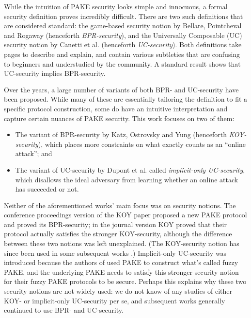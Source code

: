\documentclass{article}
\begin{document}
While the intuition of PAKE security looks simple and innocuous, a formal security definition proves incredibly difficult. There are two such definitions that are considered standard: the game-based security notion by Bellare, Pointcheval and Rogaway \cite{EC:BelPoiRog00} (henceforth \emph{BPR-security}), and the Universally Composable (UC) security notion by Canetti et al. \cite{EC:CHKLM05} (henceforth \emph{UC-security}). Both definitions take pages to describe and explain, and contain various subtleties that are confusing to beginners and understudied by the community. A standard result \cite[Appendix~A]{EC:CHKLM05} shows that UC-security implies BPR-security.

Over the years, a large number of variants of both BPR- and UC-security have been proposed. While many of these are essentially tailoring the definition to fit a specific protocol construction, some do have an intuitive interpretation and capture certain nuances of PAKE security. This work focuses on two of them:
\begin{itemize}
  \item The variant of BPR-security by Katz, Ostrovsky and Yung \cite{JACM:KatOstYun09} (henceforth \emph{KOY-security}), which places more constraints on what exactly counts as an ``online attack''; and
  \item The variant of UC-security by Dupont et al. \cite{EC:DHPRY18} called \emph{implicit-only UC-security}, which disallows the ideal adversary from learning whether an online attack has succeeded or not.
\end{itemize}
Neither of the aforementioned works' main focus was on security notions. The conference proceedings version of the KOY paper \cite{EC:KatOstYun01} proposed a new PAKE protocol and proved its BPR-security; in the journal version \cite{JACM:KatOstYun09} KOY proved that their protocol actually satisfies the stronger KOY-security, although the difference between these two notions was left unexplained. (The KOY-security notion has since been used in some subsequent works \cite{TCC:KatVai11}.) Implicit-only UC-security was introduced because the authors of \cite{EC:DHPRY18} used PAKE to construct what's called fuzzy PAKE, and the underlying PAKE needs to satisfy this stronger security notion for their fuzzy PAKE protocols to be secure. Perhaps this explains why these two security notions are not widely used: we do not know of any studies of either KOY- or implicit-only UC-security per se, and subsequent works generally continued to use BPR- and UC-security.
\end{document}
